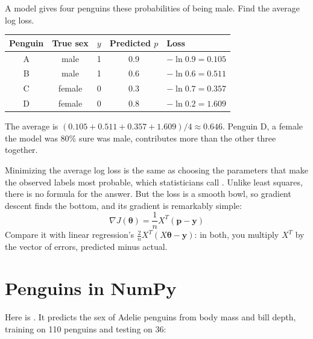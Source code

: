 \begin{Worked}
\begin{Problem}
A model gives four penguins these probabilities of being male. Find the average log loss.

\begin{center}
\begin{tabular}{c c c c l}
\textbf{Penguin} & \textbf{True sex} & $y$ & \textbf{Predicted $p$} & \textbf{Loss} \\
\hline
A & male & 1 & 0.9 & $-\ln 0.9 = 0.105$ \\
B & male & 1 & 0.6 & $-\ln 0.6 = 0.511$ \\
C & female & 0 & 0.3 & $-\ln 0.7 = 0.357$ \\
D & female & 0 & 0.8 & $-\ln 0.2 = 1.609$ \\
\end{tabular}
\end{center}
\end{Problem}
\begin{Solution}
The average is $(0.105 + 0.511 + 0.357 + 1.609)/4 \approx 0.646$. Penguin D, a female the
model was 80\% sure was male, contributes more than the other three together.
\end{Solution}
\end{Worked}

Minimizing the average log loss is the same as choosing the parameters that make the observed labels most
probable, which statisticians call . Unlike least squares, there is no formula for
the answer. But the loss is a smooth bowl, so gradient descent finds the bottom, and its gradient is
remarkably simple:
$$\nabla J(\boldsymbol{\theta}) = \frac{1}{n} X^T(\mathbf{p} - \mathbf{y})$$
Compare it with linear regression's $\frac{2}{n}X^T(X\boldsymbol{\theta} - \mathbf{y})$: in both, you multiply
$X^T$ by the vector of errors, predicted minus actual.

\section{Penguins in NumPy}
Here is . It predicts the sex of Adelie penguins from body mass and bill depth, training
on 110 penguins and testing on 36:

